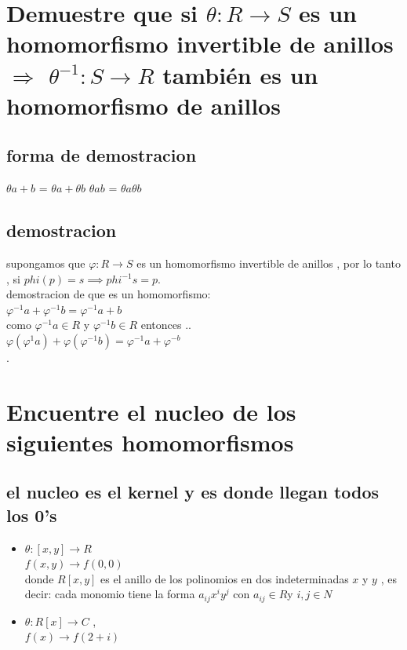 \documentclass[10pt,a4paper]{article} %
\begin{document}
    \section{Demuestre que si $ \theta : R \to S  $ es un homomorfismo
    invertible de anillos $ \Rightarrow  $  $ \theta ^{-1} : S \to R  $ también
    es un homomorfismo de anillos}
        \subsection{forma de demostracion}
            $ \theta a + b  $  = $ \theta a +  \theta b  $
            $ \theta a  b  $  = $ \theta a   \theta b  $

        \subsection{demostracion}
            supongamos que $ \varphi :R \to S  $  es un homomorfismo invertible de
            anillos , por lo tanto , si $ phi(p) = s \implies phi ^{-1} s = p $.
            \\ demostracion de que es un homomorfismo:
            \\$ \varphi ^{-1} a + \varphi ^{-1} b = \varphi ^{-1} a+b  $
            \\ como $ \varphi ^{-1} a \in R   $ y $ \varphi ^{-1} b \in R  $ entonces ..
            \\ $ \varphi(\varphi ^{1} a) + \varphi(\varphi ^{-1}  b)  = \varphi
            ^{-1} a + \varphi ^{-b}   $
            \\.



    \section{Encuentre el nucleo de los siguientes homomorfismos}
        \subsection{el nucleo es el kernel y es donde llegan todos los 0's}

    \begin{itemize}
        \item {        $ \theta :[x,y] \to R  $
    \\ $ f(x,y) \to f(0,0)  $
    \\ donde $ R[x,y]  $ es el anillo de los polinomios en dos indeterminadas $
    x  $ y $ y  $ , es decir: cada monomio  tiene la forma $ a_{ij}x ^{i} y
    ^{j}   $ con $ a_{ij} \in R $y $ i,j \in N  $}
    \item {$ \theta : R[x] \to C  $ ,
        \\ $ f(x) \to f(2+i)  $  }
    \end{itemize}
\end{document}
